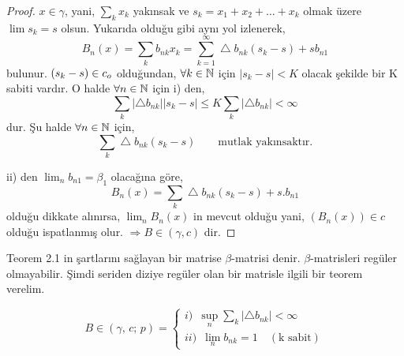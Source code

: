 \begin{proof}
$x\in\gamma$, yani, $\sum\limits_kx_k$ yakınsak ve $s_k=x_1+x_2+\ldots+x_k$ olmak üzere $\lim s_k=s$ olsun. Yukarıda olduğu gibi aynı yol izlenerek,
$$
B_n(x)=\sum_kb_{nk}x_k=\sum\limits_{k=1}^\infty\bigtriangleup b_{nk}(s_k-s)+sb_{n1}
$$
bulunur. $(s_k-s)\in c_o$ olduğundan, $\forall k\in\mathbb{N}$ için $|s_k-s|<K$ olacak şekilde bir K sabiti vardır. O halde $\forall n\in\mathbb{N}$ için i) den,
$$
\sum_k|\bigtriangleup b_{nk}||s_k-s|\leq K\sum_k|\bigtriangleup b_{nk}|<\infty
$$
dur. Şu halde $\forall n\in\mathbb{N}$ için,
$$
\sum_k\bigtriangleup b_{nk}(s_k-s)\qquad\text{mutlak yakınsaktır.}
$$

ii) den $\lim_nb_{n1}=\beta_1$ olacağına göre,
$$
B_n(x)=\sum_k\bigtriangleup b_{nk}(s_k-s)+s.b_{n1}
$$
olduğu dikkate alınırsa, $\lim_nB_n(x)$ in mevcut olduğu yani, $(B_n(x))\in c$ olduğu ispatlanmış olur. $\Rightarrow B\in (\gamma,c)$ dir.
\end{proof}

Teorem 2.1 in şartlarını sağlayan bir matrise $\beta$-matrisi denir. $\beta$-matrisleri regüler olmayabilir. Şimdi seriden diziye regüler olan bir matrisle ilgili bir teorem verelim.
\begin{theorem}
$$
B\in(\gamma,\,c;\,p)=
\begin{cases}
i)\,\,\, \sup_n\sum\limits_k|\bigtriangleup b_{nk}|<\infty\\
ii)\,\,\, \lim_nb_{nk}=1\quad(\text{k sabit})
\end{cases}
$$
\end{theorem}

